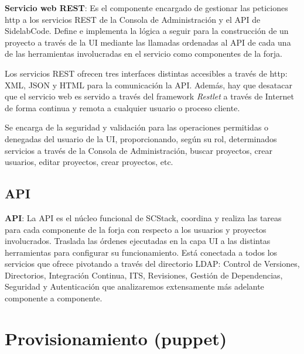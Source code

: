 \par \textbf{Servicio web REST}: Es el componente encargado de gestionar las peticiones http a los servicios REST de la Consola de Administración y el API de SidelabCode. Define e implementa la lógica a seguir para la construcción de un proyecto a través de la UI mediante las llamadas ordenadas al API de cada una de las herramientas involucradas en el servicio como componentes de la forja.

\par Los servicios REST ofrecen tres interfaces distintas accesibles a través de http: XML, JSON y HTML para la comunicación la API. Además, hay que desatacar que el servicio web es servido a través del framework \emph{Restlet} a través de Internet de forma continua y remota a cualquier usuario o proceso cliente.

\par Se encarga de la seguridad y validación para las operaciones permitidas o denegadas del usuario de la UI, proporcionando, según su rol, determinados servicios a través de la Consola de Administración, buscar proyectos, crear usuarios, editar proyectos, crear proyectos, etc.


\subsection{API}
\label{sub:api}

\par \textbf{API}: La API es el núcleo funcional de SCStack, coordina y realiza las tareas para cada componente de la forja con respecto a los usuarios y proyectos involucrados. Traslada las órdenes ejecutadas en la capa UI a las distintas herramientas para configurar su funcionamiento. Está conectada a todos los servicios que ofrece pivotando a través del directorio LDAP: Control de Versiones, Directorios, Integración Continua, ITS, Revisiones, Gestión de Dependencias, Seguridad y Autenticación que analizaremos extensamente más adelante componente a componente.



\section{Provisionamiento (puppet)}
\label{sec:puppet}


